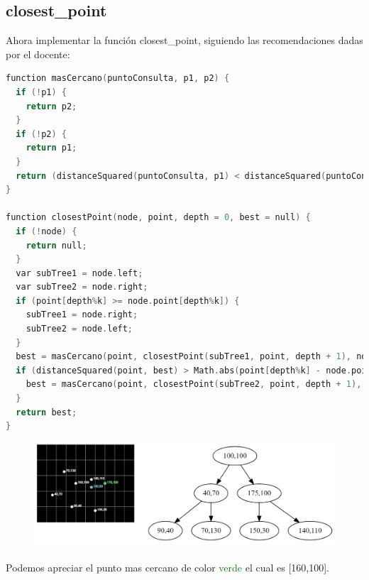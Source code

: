 \subsection{closest\_point}
Ahora implementar la función closest\_point, siguiendo las recomendaciones dadas por el docente:

\begin{lstlisting}[language=C++,
                   directivestyle={\color{black}}
                   emph={int,char,double,float,unsigned},
                   emphstyle={\color{blue}}
                  ]
function masCercano(puntoConsulta, p1, p2) {
  if (!p1) {
    return p2;
  }
  if (!p2) {
    return p1;
  }
  return (distanceSquared(puntoConsulta, p1) < distanceSquared(puntoConsulta, p2))? p1 : p2;
}

function closestPoint(node, point, depth = 0, best = null) {
  if (!node) {
    return null;
  }
  var subTree1 = node.left;
  var subTree2 = node.right;
  if (point[depth%k] >= node.point[depth%k]) {
    subTree1 = node.right;
    subTree2 = node.left;
  }
  best = masCercano(point, closestPoint(subTree1, point, depth + 1), node.point);
  if (distanceSquared(point, best) > Math.abs(point[depth%k] - node.point[depth%k])) {
    best = masCercano(point, closestPoint(subTree2, point, depth + 1), node.point);
  }
  return best;
}
\end{lstlisting}

\begin{figure}[H]
 \centering
 \includegraphics[width=1\textwidth]{images/closestPoint.PNG}
 \label{fig:act-7-closestPoint}
\end{figure}
Podemos apreciar el punto mas cercano de color \textcolor{green}{verde} el cual es [160,100].